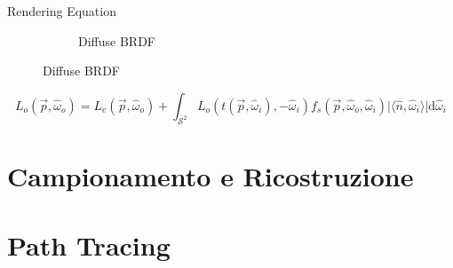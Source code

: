 \documentclass[14pt, aspectratio=169]{beamer}
\makeatletter
\def\tikzscale{1}\begin{lrbox}{\measure@tikzpicture}%
\edef\tikzscale{\pgfmathresult}%
\theoremstyle{theoremdd}
\makeatother
\begin{document}
\begin{frame}{Rendering Equation}
\begin{figure}[tb]
\begin{subfigure}[b]{0.3\textwidth}
\begin{scaletikzpicturetowidth}{\linewidth}
\end{scaletikzpicturetowidth}
				\caption{Diffuse BRDF}
			\end{subfigure}
		\end{figure}

		\begin{equation*}\label{chapter3:surface:renderingEq}
			L_o(\vec{p},\hat{\omega}_o) = L_e(\vec{p},\hat{\omega}_o) + \int_{\mathcal{S}^2}%
				L_o(t(\vec{p}, \hat{\omega}_i),-\hat{\omega}_i)f_s(\vec{p},\hat{\omega}_o,\hat{\omega}_i)%
				\vert\langle\hat{n},\hat{\omega}_i\rangle\vert\mathrm{d}\hat{\omega}_i
		\end{equation*}
	\end{frame}

	\section{Campionamento e Ricostruzione}

	\section{Path Tracing}
\end{document}
